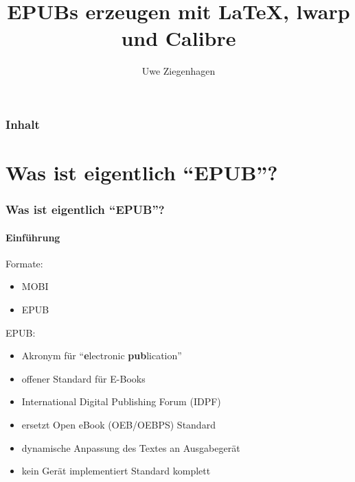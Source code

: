 \documentclass[12pt,ngerman]{beamer}
\author{Uwe Ziegenhagen}
\title{EPUBs erzeugen mit LaTeX, lwarp und Calibre}
\begin{document}
\begin{frame}

\maketitle

\end{frame}

\begin{frame}
\frametitle{Inhalt}

\tableofcontents

\end{frame}

\section{Was ist eigentlich \enquote{EPUB}?}

\begin{frame}
\frametitle{Was ist eigentlich \enquote{EPUB}?}
\framesubtitle{Einführung}

Formate:

\begin{itemize}
	\item MOBI
	\item EPUB
\end{itemize}

EPUB:

\begin{itemize}
\item Akronym für \enquote{\textbf{e}lectronic \textbf{pub}lication}
\item offener Standard für E-Books 
\item International Digital Publishing Forum (IDPF)
\item ersetzt Open eBook (OEB/OEBPS) Standard
\item dynamische Anpassung des Textes an Ausgabegerät
\item kein Gerät implementiert Standard komplett
\end{itemize}

\end{frame}
\end{document}
